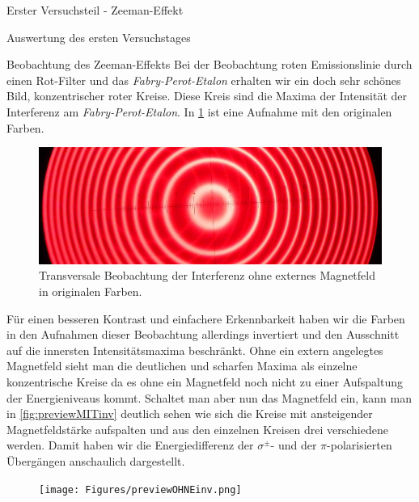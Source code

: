 \documentclass[pdftex, a4paper,11pt, twoside, ngerman]{report}
\begin{document}
\begin{chapter}{Erster Versuchsteil - Zeeman-Effekt}
\begin{section}{Auswertung des ersten Versuchstages}
      \begin{subsection}{Beobachtung des Zeeman-Effekts}
        \label{chp:Zeeman:sec:AuswertungBeobachtung}
        Bei der Beobachtung roten Emissionslinie durch einen Rot-Filter und das
        \textit{Fabry-Perot-Etalon} erhalten wir ein doch sehr schönes Bild,
        konzentrischer roter Kreise. Diese Kreis sind die Maxima der Intensität
        der Interferenz am \textit{Fabry-Perot-Etalon}. In 
        \cref{fig:previewOHNE} ist eine Aufnahme mit den originalen Farben.
        \begin{figure}[ht]
          \centering
          \includegraphics[width=\textwidth]{Figures/previewOHNEcut.jpg}
          \caption{Transversale Beobachtung der Interferenz ohne externes 
                Magnetfeld in originalen Farben.}
          \label{fig:previewOHNE}
        \end{figure}
        \newline
        Für einen besseren Kontrast und einfachere Erkennbarkeit haben wir die
        Farben in den Aufnahmen dieser Beobachtung allerdings invertiert und den
        Ausschnitt auf die innersten Intensitätsmaxima beschränkt. Ohne ein
        extern angelegtes Magnetfeld sieht man die deutlichen und scharfen
        Maxima als einzelne konzentrische Kreise da es ohne ein Magnetfeld noch
        nicht zu einer Aufspaltung der Energieniveaus kommt. Schaltet man aber
        nun das Magnetfeld ein, kann man in \cref{fig:previewMITinv} deutlich
        sehen wie sich die Kreise mit ansteigender Magnetfeldstärke aufspalten
        und aus den einzelnen Kreisen drei verschiedene werden. Damit haben wir
        die Energiedifferenz der $\sigma^{\pm}$- und der $\pi$-polarisierten
        Übergängen anschaulich dargestellt.
        \begin{figure}[b!]
          \centering
          \begin{minipage}{0.48\textwidth}
            \centering
            \texttt{[image: Figures/previewOHNEinv.png]}

\end{minipage}
\end{figure}
\end{subsection}
\end{section}
\end{chapter}
\end{document}
